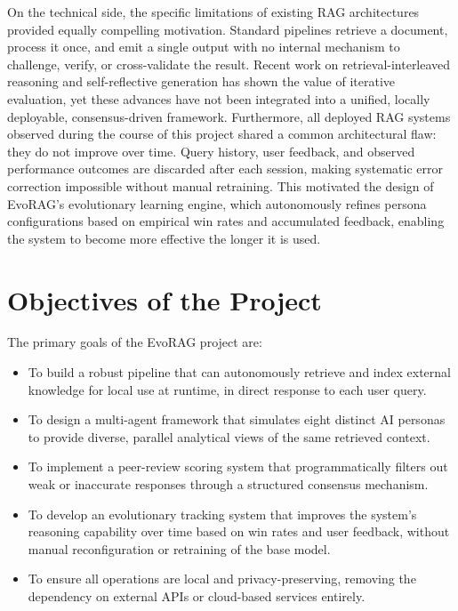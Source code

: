 On the technical side, the specific limitations of existing RAG architectures provided
equally compelling motivation.
Standard pipelines retrieve a document, process it once, and emit a single output with
no internal mechanism to challenge, verify, or cross-validate the result.
Recent work on retrieval-interleaved reasoning and self-reflective generation has
shown the value of iterative evaluation, yet
these advances have not been integrated into a unified, locally deployable,
consensus-driven framework.
Furthermore, all deployed RAG systems observed during the course of this project shared
a common architectural flaw: they do not improve over time.
Query history, user feedback, and observed performance outcomes are discarded after
each session, making systematic error correction impossible without manual retraining.
This motivated the design of EvoRAG's evolutionary learning engine, which autonomously
refines persona configurations based on empirical win rates and accumulated feedback,
enabling the system to become more effective the longer it is used.

\section{Objectives of the Project}

The primary goals of the EvoRAG project are:

\begin{itemize}
    \item To build a robust pipeline that can autonomously retrieve and index external
          knowledge for local use at runtime, in direct response to each user query.
    \item To design a multi-agent framework that simulates eight distinct AI personas
          to provide diverse, parallel analytical views of the same retrieved context.
    \item To implement a peer-review scoring system that programmatically filters out
          weak or inaccurate responses through a structured consensus mechanism.
    \item To develop an evolutionary tracking system that improves the system's
          reasoning capability over time based on win rates and user feedback, without
          manual reconfiguration or retraining of the base model.
    \item To ensure all operations are local and privacy-preserving, removing the
          dependency on external APIs or cloud-based services entirely.
\end{itemize}

